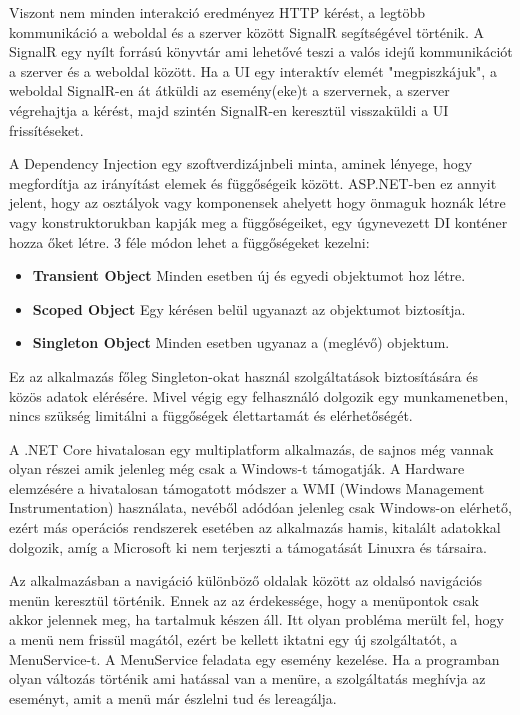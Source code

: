 Viszont nem minden interakció eredményez HTTP kérést, a legtöbb kommunikáció a weboldal és a szerver között SignalR segítségével történik. A SignalR egy nyílt forrású könyvtár ami lehetővé teszi a valós idejű kommunikációt a szerver és a weboldal között. Ha a UI egy interaktív elemét "megpiszkájuk", a weboldal SignalR-en át átküldi az esemény(eke)t a szervernek, a szerver végrehajtja a kérést, majd szintén SignalR-en keresztül visszaküldi a UI frissítéseket.

A Dependency Injection egy szoftverdizájnbeli minta, aminek lényege, hogy megfordítja az irányítást elemek és függőségeik között. ASP.NET-ben ez annyit jelent, hogy az osztályok vagy komponensek ahelyett hogy önmaguk hoznák létre vagy konstruktorukban kapják meg a függőségeiket, egy úgynevezett DI konténer hozza őket létre. 3 féle módon lehet a függőségeket kezelni:
\begin{itemize}
\item\textbf{Transient Object} Minden esetben új és egyedi objektumot hoz létre.
\item\textbf{Scoped Object} Egy kérésen belül ugyanazt az objektumot biztosítja.
\item\textbf{Singleton Object} Minden esetben ugyanaz a (meglévő) objektum.
\end{itemize}
Ez az alkalmazás főleg Singleton-okat használ szolgáltatások biztosítására és közös adatok elérésére. Mivel végig egy felhasználó dolgozik egy munkamenetben, nincs szükség limitálni a függőségek élettartamát és elérhetőségét.

A .NET Core hivatalosan egy multiplatform alkalmazás, de sajnos még vannak olyan részei amik jelenleg még csak a Windows-t támogatják. A Hardware elemzésére a hivatalosan támogatott módszer a WMI (Windows Management Instrumentation) használata, nevéből adódóan jelenleg csak Windows-on elérhető, ezért más operációs rendszerek esetében az alkalmazás hamis, kitalált adatokkal dolgozik, amíg a Microsoft ki nem terjeszti a támogatását Linuxra és társaira.

Az alkalmazásban a navigáció különböző oldalak között az oldalsó navigációs menün keresztül történik. Ennek az az érdekessége, hogy a menüpontok csak akkor jelennek meg, ha tartalmuk készen áll. Itt olyan probléma merült fel, hogy a menü nem frissül magától, ezért be kellett iktatni egy új szolgáltatót, a MenuService-t. A MenuService feladata egy esemény kezelése. Ha a programban olyan változás történik ami hatással van a menüre, a szolgáltatás meghívja az eseményt, amit a menü már észlelni tud és lereagálja. 

